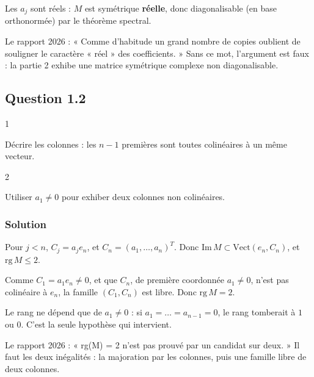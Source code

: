 \documentclass[11pt,a4paper]{article}
\begin{document}
Les \(a_j\) sont réels : \(M\) est symétrique \textbf{réelle}, donc diagonalisable (en base orthonormée) par le théorème spectral.

\begin{jury}

Le rapport 2026 : « Comme d'habitude un grand nombre de copies oublient de souligner le caractère « réel » des coefficients. » Sans ce mot, l'argument est faux : la partie 2 exhibe une matrice symétrique complexe non diagonalisable.

\end{jury}

\hypertarget{question-1.2}{%
\subsection{Question 1.2}\label{question-1.2}}

\begin{indication}{1}

Décrire les colonnes : les \(n-1\) premières sont toutes colinéaires à un même vecteur.

\end{indication}

\begin{indication}{2}

Utiliser \(a_1\ne0\) pour exhiber deux colonnes non colinéaires.

\end{indication}

\hypertarget{solution-31}{%
\subsubsection{Solution}\label{solution-31}}

Pour \(j<n\), \(C_j=a_je_n\), et \(C_n=(a_1,\dots,a_n)^T\). Donc \(\mathrm{Im}\,M\subset\mathrm{Vect}(e_n,C_n)\), et \(\mathrm{rg}\,M\le2\).

Comme \(C_1=a_1e_n\ne0\), et que \(C_n\), de première coordonnée \(a_1\ne0\), n'est pas colinéaire à \(e_n\), la famille \((C_1,C_n)\) est libre. Donc \(\mathrm{rg}\,M=2\).

\begin{piege}

Le rang ne dépend que de \(a_1\ne0\) : si \(a_1=\dots=a_{n-1}=0\), le rang tomberait à \(1\) ou \(0\). C'est la seule hypothèse qui intervient.

\end{piege}

\begin{jury}

Le rapport 2026 : « rg(M) = 2 n'est pas prouvé par un candidat sur deux. » Il faut les deux inégalités : la majoration par les colonnes, puis une famille libre de deux colonnes.

\end{jury}
\end{document}
